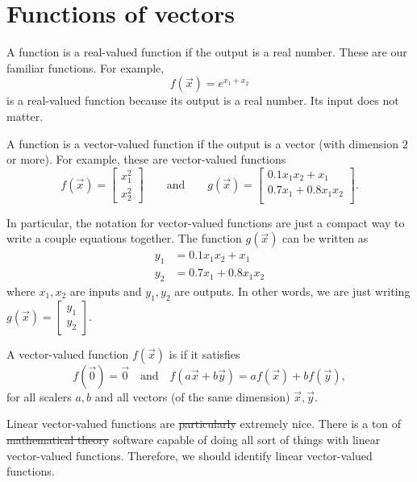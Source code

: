 \documentclass[../main.tex]{subfiles}
\begin{document}
 \section{Functions of vectors}

A function is a real-valued function if the output is a real number. These are our familiar functions.  For example, 
\[
  f(\vec{x}) = e^{x_{1} + x_{2}}
\]
is a real-valued function because its output is a real number. Its input does not matter. 

A function is a vector-valued function if the output is a vector (with dimension \(2\) or more). For example, these are vector-valued functions
\[
  f(\vec{x}) = 
  \begin{bmatrix}
    x_{1}^{2} \\
    x_{2}^{2}
  \end{bmatrix} 
  \qquad\text{and}\qquad
  g(\vec{x}) = 
  \begin{bmatrix}
    0.1 x_{1} x_{2} + x_{1} \\
    0.7 x_{1} + 0.8 x_{1} x_{2} \\
  \end{bmatrix}.
\]

In particular, the notation for vector-valued functions are just a compact way to write a couple equations together. The function \(g(\vec{x})\) can be written as 
\begin{align*}
  y_{1} &= 0.1 x_{1} x_{2} + x_{1} \\
  y_{2} &= 0.7 x_{1} + 0.8 x_{1} x_{2}
\end{align*}
where \(x_{1}, x_{2}\) are inputs and \(y_{1}, y_{2}\) are outputs. In other words, we are just writing \(g(\vec{x}) = \begin{bmatrix} y_{1} \\ y_{2} \end{bmatrix}\).

\faStar{} A vector-valued function \(f(\vec{x})\) is  if it satisfies 
\begin{equation}
  f(\vec{0}) = \vec{0} 
  \quad\text{and}\quad
  f(a \vec{x} + b \vec{y}) = a f(\vec{x}) + b f(\vec{y}),
\end{equation}
for all scalers \(a,b\) and all vectors (of the same dimension) \(\vec{x}, \vec{y}\).

Linear vector-valued functions are \sout{particularly} extremely nice.  There is a ton of \sout{mathematical theory} software capable of doing all sort of things with linear vector-valued functions. Therefore, we should identify linear vector-valued functions.
\end{document}
